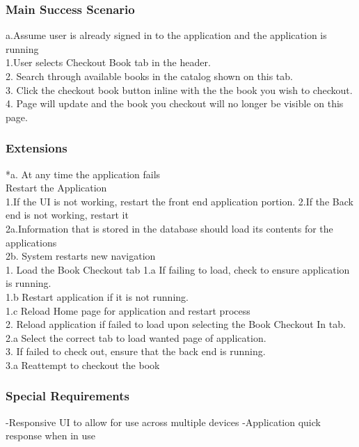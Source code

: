 \documentclass{article}
\begin{document}
	\subsubsection{\textbf{Main Success Scenario}}
	a.Assume user is already signed in to the application and the application is running\\
	1.User selects Checkout Book tab in the header. \\
	2. Search  through available books in the catalog shown on this tab. \\
	3. Click the checkout book button inline with the the book you wish to checkout.\\
	4. Page will update and the book you checkout will no longer be visible on this page. \\
	
	
	\subsubsection{\textbf{Extensions}}
	*a. At any time the application fails \\
	Restart the Application \\
	1.If the UI is not working, restart the front end application portion.
	2.If the Back end is not working, restart it \\
	2a.Information that is stored in the database should load its contents for the applications \\
	2b. System restarts new navigation \\
	1. Load the Book Checkout tab 
	1.a  If failing to load, check to ensure application is running. \\
	1.b Restart application if it is not running. \\
	1.c Reload Home page for application and restart process \\
	2. Reload application if failed to load upon selecting the Book Checkout In tab. \\
	2.a Select the correct tab to load wanted page of application.\\
	3. If failed to check out, ensure that the back end is running. \\
	3.a Reattempt to checkout the book\\
	
	
	\subsubsection{\textbf{Special Requirements}}
	-Responsive UI to allow for use across multiple devices
	-Application quick response when in use
\end{document}
